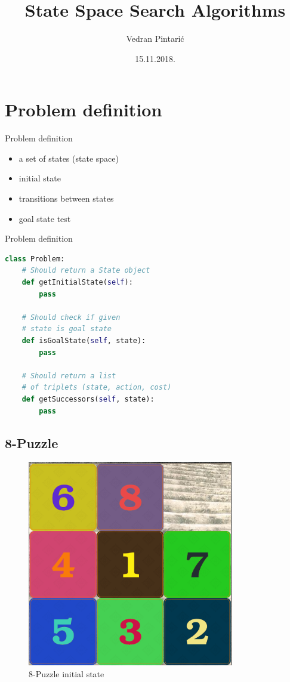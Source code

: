 \documentclass{beamer}
\title[State Space Search Algorithms]{State Space Search Algorithms}
\author{Vedran Pintarić}
\date{15.11.2018.}
\begin{document}
\begin{frame}
  \titlepage
\end{frame}

\section{Problem definition}

\begin{frame}{Problem definition}

\begin{itemize}
	\item a set of states (state space)
	\item initial state
	\item transitions between states
	\item goal state test
\end{itemize}

\end{frame}

\begin{frame}[fragile]{Problem definition}

\begin{lstlisting}[language=Python]
class Problem:
	# Should return a State object
	def getInitialState(self):
		pass

	# Should check if given
	# state is goal state
	def isGoalState(self, state):
		pass

	# Should return a list
	# of triplets (state, action, cost)
	def getSuccessors(self, state):
		pass
\end{lstlisting}

\end{frame}

\subsection{8-Puzzle}

\begin{frame}
\begin{figure}
\centering
	\includegraphics[width=0.5\linewidth]{puzzle8.png}
	\caption{8-Puzzle initial state}
\end{figure}
\end{frame}
\end{document}
